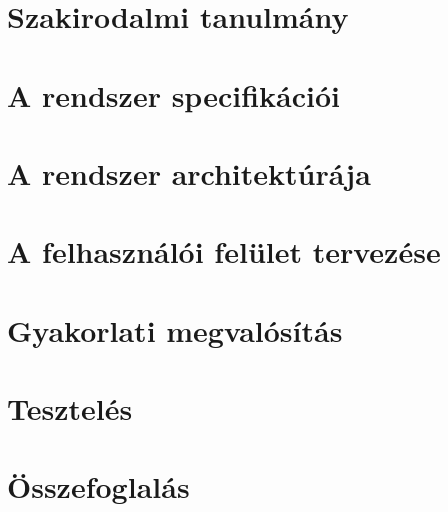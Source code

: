 \documentclass[12pt, a4paper, oneside]{report}             %
\begin{document}
\chapter{Szakirodalmi tanulmány}


\chapter{A rendszer specifikációi}


\chapter{A rendszer architektúrája}


\chapter{A felhasználói felület tervezése}


\chapter{Gyakorlati megvalósítás}


\chapter{Tesztelés}


\chapter{Összefoglalás}


\newpage
{}


\end{document}
